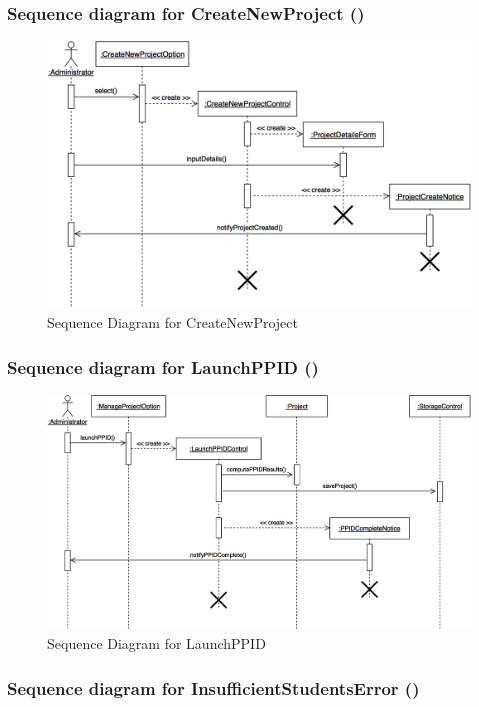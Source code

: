 \documentclass[12pt,letterpaper]{article}
\begin{document}
\subsubsection*{Sequence diagram for CreateNewProject (\createnewproject{})}

\begin{figure}[H]
	\centering{}
	\includegraphics[scale=0.3]{imgs/seq/create-new-project.png}
	\caption{Sequence Diagram for CreateNewProject}
\end{figure}

\subsubsection*{Sequence diagram for LaunchPPID (\launchppid{})}

\begin{figure}[H]
	\centering{}
	\includegraphics[scale=0.3]{imgs/seq/launch-ppid.png}
	\caption{Sequence Diagram for LaunchPPID}
\end{figure}

\subsubsection*{Sequence diagram for InsufficientStudentsError (\insufficientstudentserror{})}
\end{document}
